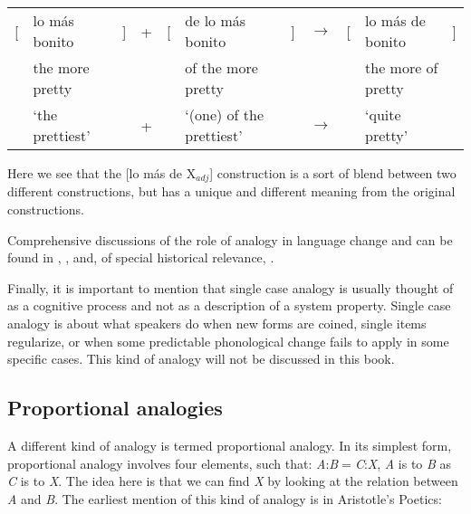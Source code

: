 
\newcommand{\spacebr}{\hspaceThis{[}}

\begin{exe}
    \ex \label{analoy-change-syntax-spanish}
    \setlength\tabcolsep{2pt} %
    \begin{tabular}[t]{l@{}l@{}lcl@{}l@{}lcl@{}l@{}l}
     [ & lo más bonito   & ] & + & [ & de lo más bonito         & ] & $\rightarrow$ & [ & lo más de bonito   & ] \\
       & the more pretty &   &   &   & of the more pretty       &   &               &   & the more of pretty &   \\
       & `the prettiest' &   & + &   & `(one) of the prettiest' &   & $\rightarrow$ &   & `quite pretty'     &   \\
    \end{tabular}
\end{exe}

Here we see that the [lo más de X$_{adj}$] construction is a sort of blend between two different constructions, but has a unique and different meaning from the original constructions.

Comprehensive discussions of the role of analogy in language change and  can be found in \textcite{Anttila.2003}, \textcites{Hock.1991, Hock.2003}, \textcite{Trask.1996} and, of special historical relevance, \textcite{Paul.1995}.

Finally, it is important to mention that single case analogy is usually thought of as a cognitive process and not as a description of a system property. Single case analogy is about what speakers do when new forms are coined, single items regularize, or when some predictable phonological change fails to apply in some specific cases. This kind of analogy will not be discussed in this book.


\subsection{Proportional analogies}


\largerpage 
A different kind of analogy is termed proportional analogy. In its simplest form, proportional analogy involves four elements, such that: \textit{A}:\textit{B}$=$\textit{C}:\textit{X}, \textit{A} is to \textit{B} as \textit{C} is to \textit{X}. The idea here is that we can find \textit{X} by looking at the relation between \textit{A} and \textit{B}. The earliest mention of this kind of analogy is in Aristotle's Poetics:

